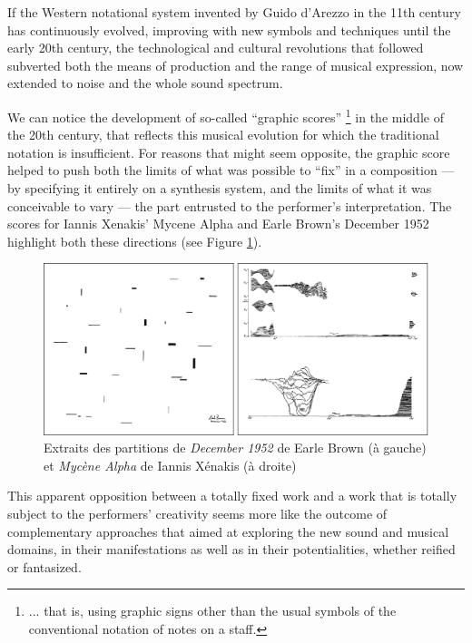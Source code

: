 If the Western notational system invented by Guido d'Arezzo in the 11th century has continuously evolved, improving with new symbols and techniques until the early 20th century, the technological and cultural revolutions that followed subverted both the means of production and the range of musical expression, now extended to noise and the whole sound spectrum.

We can notice the development of so-called “graphic scores” \footnote{... that is, using graphic signs other than the usual symbols of the conventional notation of notes on a staff.} in the middle of the 20th century, that reflects this musical evolution for which the traditional notation is insufficient. For reasons that might seem opposite, the graphic score helped to push both the limits of what was possible to “fix” in a composition — by specifying it entirely on a synthesis system, and the limits of what it was conceivable to vary — the part entrusted to the performer's interpretation. The scores for Iannis Xenakis' Mycene Alpha and Earle Brown's December 1952 highlight both these directions (see Figure \ref{fig:notation:brown-xenakis}).

\begin{figure}[htb]
	\includegraphics[width=\textwidth]{gfx/notation/Brown-Xenakis-Paysage.png}
	\caption{Extraits des partitions de \textit{December 1952} de Earle Brown (à gauche) et \textit{Mycène Alpha} de Iannis Xénakis (à droite)}
	\label{fig:notation:brown-xenakis}
\end{figure}

This apparent opposition between a totally fixed work and a work that is totally subject to the performers' creativity seems more like the outcome of complementary approaches that aimed at exploring the new sound and musical domains, in their manifestations as well as in their potentialities, whether reified or fantasized.

